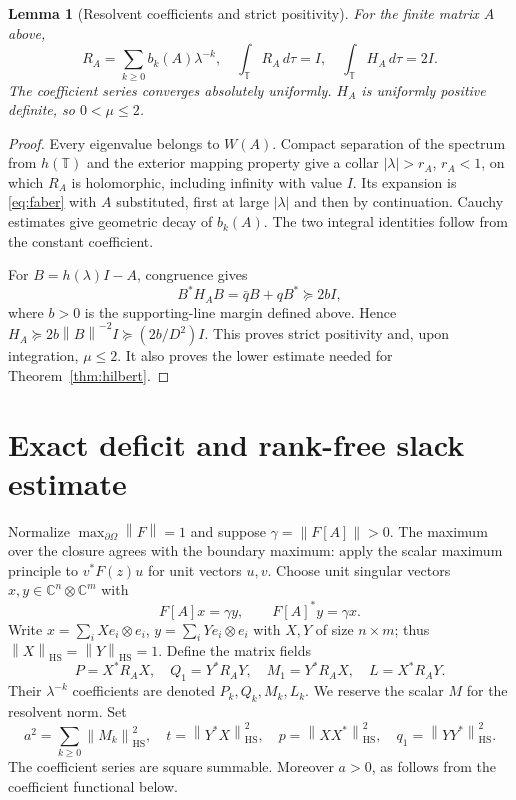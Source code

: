 \documentclass[11pt]{article}
\newtheorem{lemma}[theorem]{Lemma}
\theoremstyle{remark}\newtheorem{remark}[theorem]{Remark}
\newcommand{\HS}{\mathrm{HS}}
\newcommand{\T}{\mathbb T}
\newcommand{\C}{\mathbb C}
\newcommand{\norm}[1]{\left\lVert #1\right\rVert}
\begin{document}
\begin{lemma}[Resolvent coefficients and strict positivity]\label{lem:resolvent}
For the finite matrix $A$ above,
\[R_A=\sum_{k\ge0}b_k(A)\lambda^{-k},\quad \int_\T R_A\,d\tau=I,\quad
\int_\T H_A\,d\tau=2I.
\]
The coefficient series converges absolutely uniformly. $H_A$ is uniformly positive definite, so $0<\mu\le2$.
\end{lemma}
\begin{proof}
Every eigenvalue belongs to $W(A)$. Compact separation of the spectrum from $h(\T)$ and the exterior mapping property give a collar $|\lambda|>r_A$, $r_A<1$, on which $R_A$ is holomorphic, including infinity with value $I$. Its expansion is \eqref{eq:faber} with $A$ substituted, first at large $|\lambda|$ and then by continuation. Cauchy estimates give geometric decay of $b_k(A)$. The two integral identities follow from the constant coefficient.

For $B=h(\lambda)I-A$, congruence gives
\begin{equation}\label{eq:congruence}
B^*H_AB=\bar qB+qB^*\succeq2bI,
\end{equation}
where $b>0$ is the supporting-line margin defined above. Hence
$H_A\succeq2b\norm{B}^{-2}I\succeq(2b/D^2)I$. This proves strict positivity and, upon integration, $\mu\le2$. It also proves the lower estimate needed for Theorem~\ref{thm:hilbert}.
\end{proof}

\section{Exact deficit and rank-free slack estimate}
Normalize $\max_{\partial\Omega}\norm{F}=1$ and suppose $\gamma=\norm{F[A]}>0$. The maximum over the closure agrees with the boundary maximum: apply the scalar maximum principle to $v^*F(z)u$ for unit vectors $u,v$. Choose unit singular vectors $x,y\in\C^n\otimes\C^m$ with
\[F[A]x=\gamma y,\qquad F[A]^*y=\gamma x.
\]
Write $x=\sum_i Xe_i\otimes e_i$, $y=\sum_i Ye_i\otimes e_i$ with $X,Y$ of size $n\times m$; thus $\norm X_\HS=\norm Y_\HS=1$. Define the matrix fields
\[P=X^*R_AX,\quad Q_1=Y^*R_AY,\quad M_1=Y^*R_AX,\quad L=X^*R_AY.
\]
Their $\lambda^{-k}$ coefficients are denoted $P_k,Q_k,M_k,L_k$. We reserve the scalar $M$ for the resolvent norm. Set
\[a^2=\sum_{k\ge0}\norm{M_k}_\HS^2,
\quad t=\norm{Y^*X}_\HS^2,
\quad p=\norm{XX^*}_\HS^2,\quad q_1=\norm{YY^*}_\HS^2.
\]
The coefficient series are square summable. Moreover $a>0$, as follows from the coefficient functional below.
\end{document}
